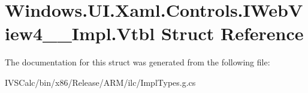 \hypertarget{struct_windows_1_1_u_i_1_1_xaml_1_1_controls_1_1_i_web_view4_____impl_1_1_vtbl}{}\section{Windows.\+U\+I.\+Xaml.\+Controls.\+I\+Web\+View4\+\_\+\+\_\+\+Impl.\+Vtbl Struct Reference}
\label{struct_windows_1_1_u_i_1_1_xaml_1_1_controls_1_1_i_web_view4_____impl_1_1_vtbl}


The documentation for this struct was generated from the following file\+:\begin{DoxyCompactItemize}
\item 
I\+V\+S\+Calc/bin/x86/\+Release/\+A\+R\+M/ilc/Impl\+Types.\+g.\+cs\end{DoxyCompactItemize}

